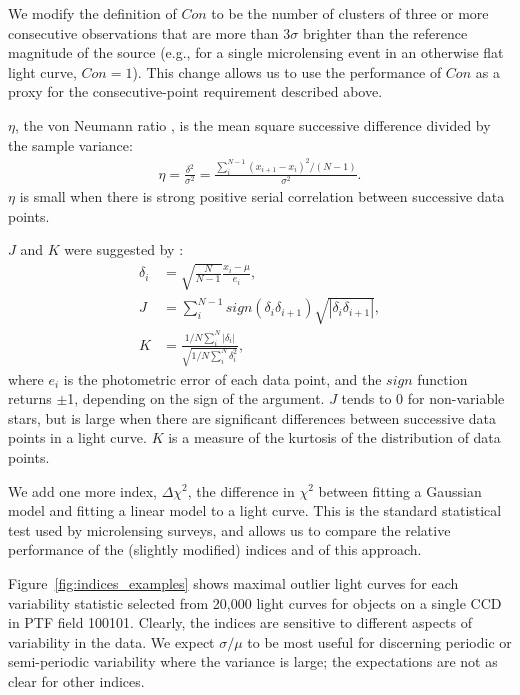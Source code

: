 \documentclass{emulateapj}
\newcommand{\apwsim}{\raisebox{0.2ex}{\scriptsize$\sim$\normalsize}}
\begin{document}
We modify the definition of $Con$ to be the number of clusters of three or more consecutive observations that are more than $3\sigma$ brighter than the reference magnitude of the source (e.g., for a single microlensing event in an otherwise flat light curve, $Con=1$). This change allows us to use the performance of $Con$ as a proxy for the consecutive-point requirement described above. 

$\eta$, the von Neumann ratio \citep{von_neumann1941}, is the mean square successive difference divided by the sample variance:
\begin{align}
	\eta = \frac{\delta^2}{\sigma^2} = \frac{\sum^{N-1}_i(x_{i+1} - x_i)^2/(N-1)}{\sigma^2}.
\end{align}
$\eta$ is small when there is strong positive serial correlation between successive data points. 

$J$ and $K$ were suggested by \cite{stetson1996}:
\begin{align}
	\delta_i &= \sqrt{\frac{N}{N-1}}\frac{x_i-\mu}{e_i},\\
	J &= \sum^{N-1}_i sign(\delta_i \delta_{i+1})\sqrt{|\delta_i \delta_{i+1}|},\\
	K &= \frac{1/N\sum^N_i |\delta_i|}{\sqrt{1/N\sum^N_i\delta_i^2}},
\end{align}
where $e_i$ is the photometric error of each data point, and the $sign$ function returns $\pm$1, depending on the sign of the argument. $J$ tends to 0 for non-variable stars, but is large when there are significant differences between successive data points in a light curve. $K$ is a measure of the kurtosis of the distribution of data points.

We add one more index, $\Delta \chi^2$, the difference in $\chi^2$ between fitting a Gaussian model and fitting a linear model to a light curve. This is the standard statistical test used by microlensing surveys, and allows us to compare the relative performance of the (slightly modified) \cite{shin2009} indices and of this approach. 

Figure~\ref{fig:indices_examples} shows maximal outlier light curves for each variability statistic selected from \apwsim20,000 light curves for objects on a single CCD in PTF field 100101. %
Clearly, the indices are sensitive to different aspects of variability in the data. We expect $\sigma/\mu$ to be most useful for discerning periodic or semi-periodic variability where the variance is large; the expectations are not as clear for other indices. 
\end{document}

